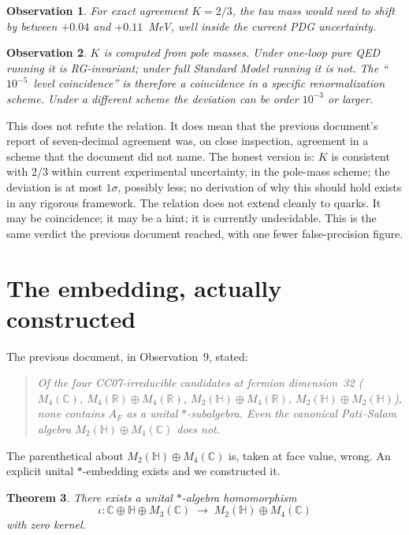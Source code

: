 \documentclass[11pt,a4paper]{article}
\newtheorem{theorem}{Theorem}
\newtheorem{observation}[theorem]{Observation}
\begin{document}
\begin{observation}\label{obs:koide-current}
For exact agreement $K = 2/3$, the tau mass would need to shift by between
$+0.04$ and $+0.11$~MeV, well inside the current PDG uncertainty.
\end{observation}

\begin{observation}\label{obs:koide-scheme}
$K$ is computed from pole masses. Under one-loop pure QED running it is
RG-invariant; under full Standard Model running it is not. The
``$10^{-5}$~level coincidence'' is therefore a coincidence in a specific
renormalization scheme. Under a different scheme the deviation can be order
$10^{-3}$ or larger.
\end{observation}

This does not refute the relation. It does mean that the previous document's
report of seven-decimal agreement was, on close inspection, agreement in a
scheme that the document did not name. The honest version is: $K$ is consistent
with $2/3$ within current experimental uncertainty, in the pole-mass scheme;
the deviation is at most $1\sigma$, possibly less; no derivation of why this
should hold exists in any rigorous framework. The relation does not extend
cleanly to quarks. It may be coincidence; it may be a hint; it is currently
undecidable. This is the same verdict the previous document reached, with one
fewer false-precision figure.

\section{The embedding, actually constructed}\label{sec:embedding}

The previous document, in Observation~9, stated:

\begin{quote}\itshape
Of the four CC07-irreducible candidates at fermion dimension~32 ($M_4(\mathbb{C})$,
$M_4(\mathbb{R}) \oplus M_4(\mathbb{R})$, $M_2(\mathbb{H}) \oplus M_4(\mathbb{R})$,
$M_2(\mathbb{H}) \oplus M_2(\mathbb{H})$), none contains $A_F$ as a unital
$*$-subalgebra. Even the canonical Pati--Salam algebra $M_2(\mathbb{H}) \oplus
M_4(\mathbb{C})$ does not.
\end{quote}

The parenthetical about $M_2(\mathbb{H}) \oplus M_4(\mathbb{C})$ is, taken at
face value, wrong. An explicit unital $*$-embedding exists and we constructed it.

\begin{theorem}\label{thm:embedding}
There exists a unital $*$-algebra homomorphism
\[
  \iota \colon \mathbb{C} \oplus \mathbb{H} \oplus M_3(\mathbb{C})
  \;\longrightarrow\; M_2(\mathbb{H}) \oplus M_4(\mathbb{C})
\]
with zero kernel.
\end{theorem}
\end{document}
